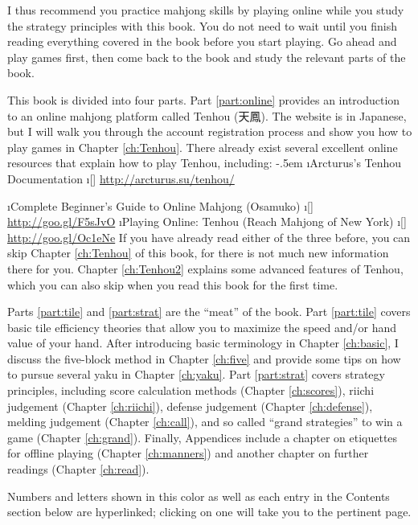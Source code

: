 \bigskip
I thus recommend you practice mahjong skills by playing online while you study the strategy principles with this book. You do not need to wait until you finish reading everything covered in the book before you start playing. Go ahead and play games first, then come back to the book and study the relevant parts of the book.

\bigskip

This book is divided into four parts. Part \ref{part:online} provides an introduction to an online mahjong platform called {\jap Tenhou} (天鳳). The website is in Japanese, but I will walk you through the account registration process and show you how to play games in Chapter \ref{ch:Tenhou}. There already exist several excellent online resources that explain how to play {\jap Tenhou}, including:
\bi \itemsep-.5em
\i Arcturus's Tenhou Documentation
\vspace{-10pt} 
	\bi
	\i[] \url{http://arcturus.su/tenhou/}
	\ei

\i Complete Beginner's Guide to Online Mahjong (Osamuko)
\vspace{-10pt} 
	\bi
	\i[] \url{http://goo.gl/F5sJvO}
	\ei
\i Playing Online: Tenhou (Reach Mahjong of New York)
	\bi \i[] \url{http://goo.gl/Oc1eNe} \ei
\ei
If you have already read either of the three before, you can skip Chapter \ref{ch:Tenhou} of this book, for there is not much new information there for you. Chapter \ref{ch:Tenhou2} explains some advanced features of {\jap Tenhou}, which you can also skip when you read this book for the first time.

\bigskip
Parts \ref{part:tile} and \ref{part:strat} are the ``meat'' of the book.
Part \ref{part:tile} covers basic tile efficiency theories that allow you to maximize the speed and/or hand value of your hand. After introducing basic terminology in Chapter \ref{ch:basic}, I discuss the five-block method in Chapter \ref{ch:five} and provide some tips on how to pursue several {\jap yaku} in Chapter \ref{ch:yaku}.
Part \ref{part:strat} covers strategy principles, including score calculation methods (Chapter \ref{ch:scores}), riichi judgement (Chapter \ref{ch:riichi}), defense judgement (Chapter \ref{ch:defense}), melding judgement (Chapter \ref{ch:call}), and so called ``grand strategies'' to win a game (Chapter \ref{ch:grand}).
Finally, Appendices include a chapter on etiquettes for offline playing (Chapter \ref{ch:manners}) and another chapter on further readings (Chapter \ref{ch:read}).

\bigskip
Numbers and letters shown {\color{MyBlue} in this color} as well as each entry in the Contents section below are hyperlinked; clicking on one will take you to the pertinent page.

